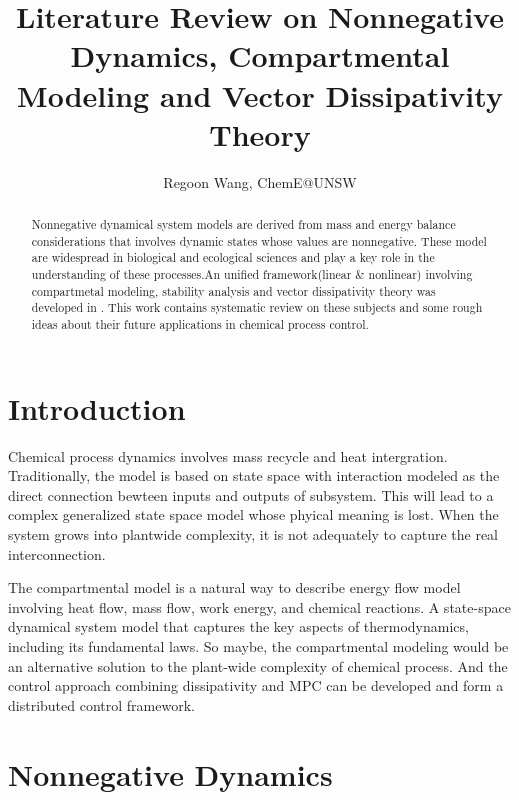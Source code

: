 \documentclass{paper}
\begin{document}
 
\title{Literature Review on Nonnegative Dynamics, Compartmental Modeling and Vector Dissipativity Theory}
\author{Regoon Wang, ChemE@UNSW} 


\maketitle
\begin{abstract}
Nonnegative dynamical system models are derived from mass and energy balance considerations that
involves dynamic states whose values are nonnegative. These model are widespread in biological
and ecological sciences and play a key role in the understanding of these processes.An unified
framework(linear \& nonlinear) involving compartmetal modeling, stability analysis and vector 
dissipativity theory was developed in \cite{bern_comp,hadd_non,hadd_thermo1,hadd_thermo2}. 
This work contains systematic review on these subjects and some rough ideas about their future
applications in chemical process control.
\end{abstract} 

\tableofcontents
\section{Introduction}
Chemical process dynamics involves mass recycle and heat intergration. Traditionally, the model is based on state
space with interaction modeled as the direct connection bewteen inputs and outputs of subsystem. This will lead to
a complex generalized state space model whose phyical meaning is lost. When the system grows into plantwide
complexity, it is not adequately to capture the real interconnection.

The compartmental model is a natural way to describe energy flow model involving heat flow, mass flow, work energy, 
and chemical reactions. A state-space dynamical system model that captures the key aspects of thermodynamics, 
including its fundamental laws. So maybe, the compartmental modeling would be an alternative solution to the
plant-wide complexity of chemical process. And the control approach combining dissipativity and MPC can be
developed and form a distributed control framework.
\section{Nonnegative Dynamics}
\end{document}
